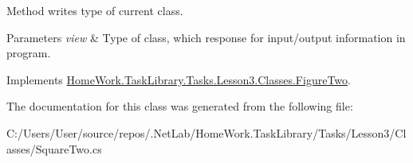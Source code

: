 Method writes type of current class. 


\begin{DoxyParams}{Parameters}
{\em view} & Type of class, which response for input/output information in program.\\
\hline
\end{DoxyParams}


Implements \mbox{\hyperlink{class_home_work_1_1_task_library_1_1_tasks_1_1_lesson3_1_1_classes_1_1_figure_two_a9588ffcda1d6b5778e4670bb48c7060b}{Home\+Work.\+Task\+Library.\+Tasks.\+Lesson3.\+Classes.\+Figure\+Two}}.



The documentation for this class was generated from the following file\+:\begin{DoxyCompactItemize}
\item 
C\+:/\+Users/\+User/source/repos/.\+Net\+Lab/\+Home\+Work.\+Task\+Library/\+Tasks/\+Lesson3/\+Classes/Square\+Two.\+cs\end{DoxyCompactItemize}
